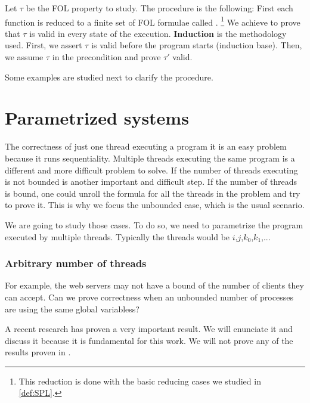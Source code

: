 Let $\tau$ be the \gls{FOL} property to study. 
%
The procedure is the following:
%
First each function is reduced to a finite set of \gls{FOL} formulae called .
%
\footnote{This reduction is done with the basic reducing cases we studied in \ref{def:SPL}.}
%
We achieve to prove that $\tau$ is valid in every state of the execution.
%
\textbf{Induction} is the methodology used.
%
First, we assert $\tau$ is valid before the program starts (induction base).
%
Then, we assume $\tau$ in the precondition and prove $\tau'$ valid.



Some examples are studied next to clarify the procedure.

\begin{example}

\end{example}




\section{Parametrized systems}

The correctness of just one thread executing a program it is an easy problem because it runs sequentiality.
%
Multiple threads executing the same program is a different and more difficult problem to solve.
%
If the number of threads executing is not bounded is another important and difficult step.
%
If the number of threads is bound, one could unroll the formula for all the threads in the problem and try to prove it. 
%
This is why we focus the unbounded case, which is the usual scenario.

We are going to study those cases. 
%
To do so, we need to parametrize the program executed by multiple threads.
%
Typically the threads would be $i$,$j$,$k_0$,$k_1$,... 
%
\subsubsection{Arbitrary number of threads}

For example, the web servers may not have a bound of the number of clients they can accept.
%
Can we prove correctness when an unbounded number of processes are using the same global variabless?

A recent research  has proven a very important result. 
%
We will enunciate it and discuss it because it is fundamental for this work. 
%
We will not prove any of the results proven in \citep{paperParametrizedInvariants}.

